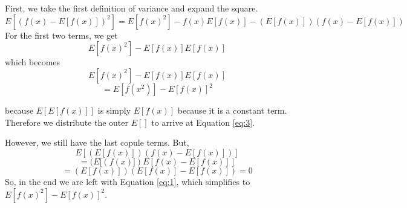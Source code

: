 \documentclass{article}
\begin{document}
		First, we take the first definition of variance and expand the square.
		\[ E[(f(x) - E[f(x)])^{2}] = E[f(x)^{2}] - f(x)E[f(x)] - (E[f(x)])(f(x) - E[f(x)])\]
		For the first two terms, we get
		\begin{equation}
				E[f(x)^{2}] - E[f(x)]E[f(x)]
			\label{eq:1}
		\end{equation}
		which becomes
		\begin{equation}
			\label{eq:2}
			 E[f(x)^{2}] - E[f(x)]E[f(x)]
		\end{equation}
		\begin{equation}
				\label{eq:3}
			 = E[f(x^{2})] - E[f(x)]^{2}
		\end{equation}

		because $E[E[f(x)]]$ is simply $E[f(x)]$ because it is a constant term. Therefore we distribute the outer
		$E[]$ to arrive at Equation \ref{eq:3}.

		However, we still have the last copule terms. But,
		\[ E[(E[f(x)])(f(x) - E[f(x)])]\]
		\[ = (E[(f(x)])E[f(x) - E[f(x)]]\]
		\[ = (E[f(x)])(E[f(x)] - E[f(x)]) = 0\]
		So, in the end we are left with Equation \ref{eq:1}, which simplifies to $E[f(x)^{2}] - E[f(x)]^{2}$.
\end{document}
